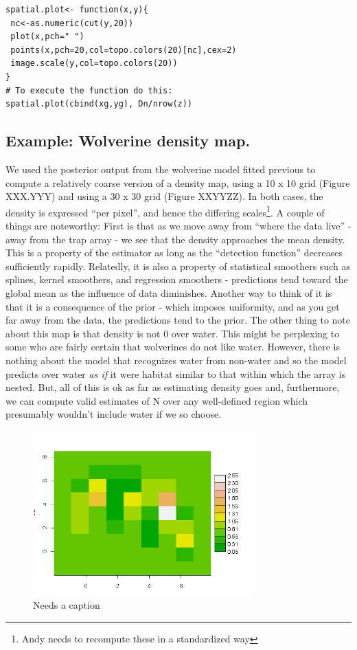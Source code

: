 \begin{verbatim}
spatial.plot<- function(x,y){
 nc<-as.numeric(cut(y,20))
 plot(x,pch=" ")
 points(x,pch=20,col=topo.colors(20)[nc],cex=2)
 image.scale(y,col=topo.colors(20))
}
# To execute the function do this:
spatial.plot(cbind(xg,yg), Dn/nrow(z))
\end{verbatim}

\subsection{Example: Wolverine density map. } 

We used the posterior output from the wolverine model fitted previous
to compute a relatively coarse version of a density map, using a 10 x
10 grid (Figure XXX.YYY) and using a 30 x 30 grid (Figure XXYYZZ). In
both cases, the density is expressed ``per pixel'', and hence the
differing scales\footnote{Andy needs to recompute these in a
  standardized way}. A couple of things are noteworthy: First is that
as we move away from ``where the data live'' - away from the trap array - we see that the density approaches the mean density. This is a property of the estimator as long as the ``detection function'' decreases sufficiently rapidly. Relatedly, it is also a property of statistical smoothers such as splines, kernel smoothers, and regression smoothers - predictions tend toward the global mean as the influence of data diminishes. Another way to think of it is that it is a consequence of the prior - which imposes uniformity, and as you get far away from the data, the predictions tend to the prior. The other thing to note about this map is that density is not 0 over water. This might be perplexing to some who are fairly certain that wolverines do not like water. However, there is nothing about the model that recognizes water from non-water and so the model predicts over water {\it as if} it were habitat similar to that within which the array is nested. But, all of this is ok as far as estimating density goes and, furthermore, we can compute valid estimates of N over any well-defined region which presumably wouldn't include water if we so choose. 
\begin{figure}
\begin{center}
\includegraphics[height=2.5in]{figs/densitymap1}
\end{center}
\caption{Needs a caption}
\label{fig.densitymap1}
\end{figure}

